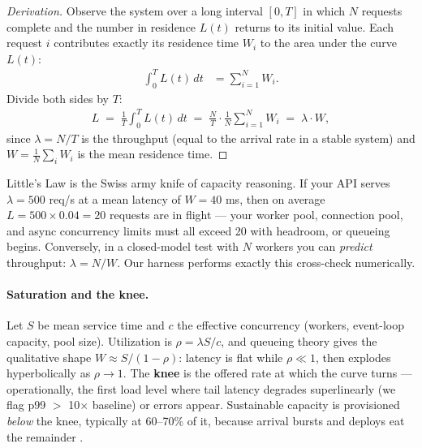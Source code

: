 \begin{proof}[Derivation]
Observe the system over a long interval $[0, T]$ in which $N$ requests
complete and the number in residence $L(t)$ returns to its initial value.
Each request $i$ contributes exactly its residence time $W_i$ to the area
under the curve $L(t)$:
\begin{align}
\int_{0}^{T} L(t)\,dt &= \sum_{i=1}^{N} W_i.
\end{align}
Divide both sides by $T$:
\begin{align}
L \;=\; \frac{1}{T}\int_{0}^{T} L(t)\,dt \;=\; \frac{N}{T}\cdot\frac{1}{N}\sum_{i=1}^{N} W_i \;=\; \lambda \cdot W,
\end{align}
since $\lambda = N/T$ is the throughput (equal to the arrival rate in a
stable system) and $W = \frac{1}{N}\sum_i W_i$ is the mean residence time.
\end{proof}

Little's Law is the Swiss army knife of capacity reasoning. If your API
serves $\lambda = 500$ req/s at a mean latency of $W = 40$ ms, then on
average $L = 500 \times 0.04 = 20$ requests are in flight --- your worker
pool, connection pool, and async concurrency limits must all exceed 20 with
headroom, or queueing begins. Conversely, in a closed-model test with $N$
workers you can \emph{predict} throughput: $\lambda = N / W$. Our harness
performs exactly this cross-check numerically.

\paragraph{Saturation and the knee.}
Let $S$ be mean service time and $c$ the effective concurrency (workers,
event-loop capacity, pool size). Utilization is $\rho = \lambda S / c$, and
queueing theory gives the qualitative shape $W \approx S / (1 - \rho)$:
latency is flat while $\rho \ll 1$, then explodes hyperbolically as
$\rho \to 1$. The \textbf{knee} is the offered rate at which the curve
turns --- operationally, the first load level where tail latency degrades
superlinearly (we flag p99 $>$ 10$\times$ baseline) or errors appear.
Sustainable capacity is provisioned \emph{below} the knee, typically at
60--70\% of it, because arrival bursts and deploys eat the remainder
\cite{beyer2016sre,nygard2018releaseit}.

